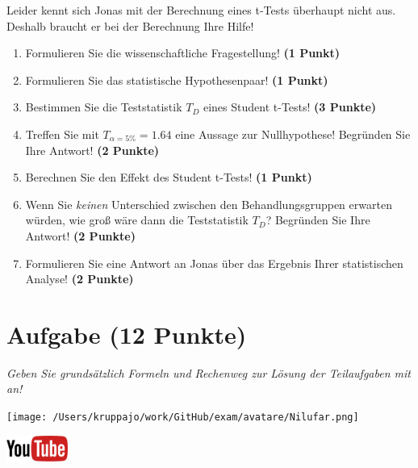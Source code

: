 \documentclass[a4paper, 9pt]{scrartcl}\usepackage[]{graphicx}\usepackage[]{xcolor}
\begin{document}
Leider kennt sich Jonas mit der Berechnung eines t-Tests überhaupt nicht aus. Deshalb braucht er bei der Berechnung Ihre Hilfe!

\begin{enumerate}
  \item Formulieren Sie die wissenschaftliche Fragestellung! \textbf{(1 Punkt)}
  \item Formulieren Sie das statistische Hypothesenpaar! \textbf{(1 Punkt)}
  \item Bestimmen Sie die Teststatistik $T_{D}$ eines Student t-Tests! \textbf{(3 Punkte)}
\item Treffen Sie mit $T_{\alpha = 5\%} = 1.64$ eine Aussage zur Nullhypothese! Begründen Sie Ihre Antwort! \textbf{(2 Punkte)}
\item Berechnen Sie den Effekt des Student t-Tests! \textbf{(1 Punkt)}
\item Wenn Sie \textit{keinen} Unterschied zwischen den Behandlungsgruppen erwarten würden, wie groß wäre dann die Teststatistik $T_{D}$? Begründen Sie Ihre Antwort! \textbf{(2 Punkte)}
\item Formulieren Sie eine Antwort an Jonas über das Ergebnis Ihrer statistischen Analyse! \textbf{(2 Punkte)}
\end{enumerate} 
\clearpage

\section{Aufgabe \hfill (12 Punkte)}

\textit{Geben Sie grundsätzlich Formeln und Rechenweg zur Lösung der Teilaufgaben mit an!} \\[1Ex]
 

 
\begin{minipage}[t]{0.5\textwidth}
\texttt{[image: /Users/kruppajo/work/GitHub/exam/avatare/Nilufar.png]}
\end{minipage}
\begin{minipage}[t]{0.5\textwidth}
\hfill
\href{https://youtu.be/TbSEOMCQYl4}{\includegraphics[width = 2cm]{img/youtube}}\\[1Ex]
\end{minipage}
\vspace{1ex}
\end{document}
